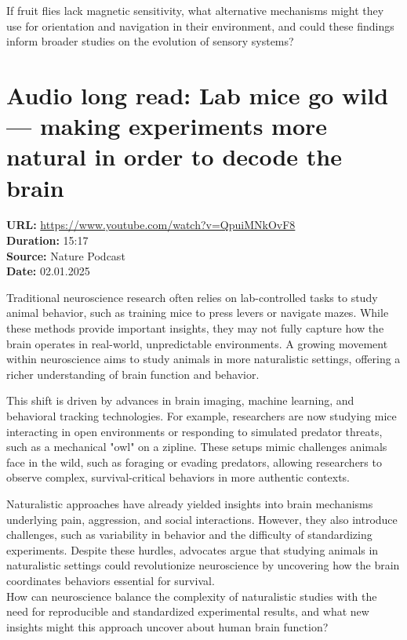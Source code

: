 \documentclass[12pt]{article}
\begin{document}
If fruit flies lack magnetic sensitivity, what alternative mechanisms might they use for orientation and navigation in their environment, and could these findings inform broader studies on the evolution of sensory systems?  


\newpage

\section{Audio long read: Lab mice go wild — making experiments more natural in order to decode the brain}
\textbf{URL:} \url{https://www.youtube.com/watch?v=QpuiMNkOvF8}\\
\textbf{Duration:} 15:17\\
\textbf{Source:} Nature Podcast\\
\textbf{Date:} 02.01.2025


Traditional neuroscience research often relies on lab-controlled tasks to study animal behavior, such as training mice to press levers or navigate mazes. While these methods provide important insights, they may not fully capture how the brain operates in real-world, unpredictable environments. A growing movement within neuroscience aims to study animals in more naturalistic settings, offering a richer understanding of brain function and behavior.  

This shift is driven by advances in brain imaging, machine learning, and behavioral tracking technologies. For example, researchers are now studying mice interacting in open environments or responding to simulated predator threats, such as a mechanical "owl" on a zipline. These setups mimic challenges animals face in the wild, such as foraging or evading predators, allowing researchers to observe complex, survival-critical behaviors in more authentic contexts.  

Naturalistic approaches have already yielded insights into brain mechanisms underlying pain, aggression, and social interactions. However, they also introduce challenges, such as variability in behavior and the difficulty of standardizing experiments. Despite these hurdles, advocates argue that studying animals in naturalistic settings could revolutionize neuroscience by uncovering how the brain coordinates behaviors essential for survival.\\[5px]  
  
How can neuroscience balance the complexity of naturalistic studies with the need for reproducible and standardized experimental results, and what new insights might this approach uncover about human brain function?  
\end{document}
